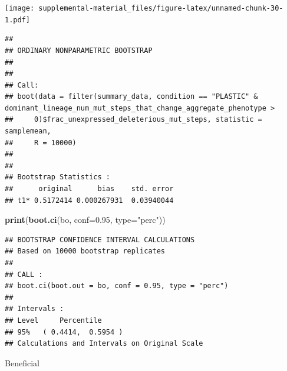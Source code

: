 \documentclass[]{book}
\newenvironment{Shaded}{\begin{snugshade}}{\end{snugshade}}
\newcommand{\DataTypeTok}[1]{\textcolor[rgb]{0.13,0.29,0.53}{#1}}
\newcommand{\DecValTok}[1]{\textcolor[rgb]{0.00,0.00,0.81}{#1}}
\newcommand{\FloatTok}[1]{\textcolor[rgb]{0.00,0.00,0.81}{#1}}
\newcommand{\KeywordTok}[1]{\textcolor[rgb]{0.13,0.29,0.53}{\textbf{#1}}}
\newcommand{\NormalTok}[1]{#1}
\newcommand{\OperatorTok}[1]{\textcolor[rgb]{0.81,0.36,0.00}{\textbf{#1}}}
\newcommand{\StringTok}[1]{\textcolor[rgb]{0.31,0.60,0.02}{#1}}
\begin{document}
\texttt{[image: supplemental-material\_files/figure-latex/unnamed-chunk-30-1.pdf]}

\begin{Shaded}
\end{Shaded}

\begin{verbatim}
## 
## ORDINARY NONPARAMETRIC BOOTSTRAP
## 
## 
## Call:
## boot(data = filter(summary_data, condition == "PLASTIC" & dominant_lineage_num_mut_steps_that_change_aggregate_phenotype > 
##     0)$frac_unexpressed_deleterious_mut_steps, statistic = samplemean, 
##     R = 10000)
## 
## 
## Bootstrap Statistics :
##      original      bias    std. error
## t1* 0.5172414 0.000267931  0.03940044
\end{verbatim}

\begin{Shaded}
\begin{Highlighting}[]
\KeywordTok{print}\NormalTok{(}\KeywordTok{boot.ci}\NormalTok{(bo, }\DataTypeTok{conf=}\FloatTok{0.95}\NormalTok{, }\DataTypeTok{type=}\StringTok{"perc"}\NormalTok{))}
\end{Highlighting}
\end{Shaded}

\begin{verbatim}
## BOOTSTRAP CONFIDENCE INTERVAL CALCULATIONS
## Based on 10000 bootstrap replicates
## 
## CALL : 
## boot.ci(boot.out = bo, conf = 0.95, type = "perc")
## 
## Intervals : 
## Level     Percentile     
## 95%   ( 0.4414,  0.5954 )  
## Calculations and Intervals on Original Scale
\end{verbatim}

Beneficial
\end{document}
